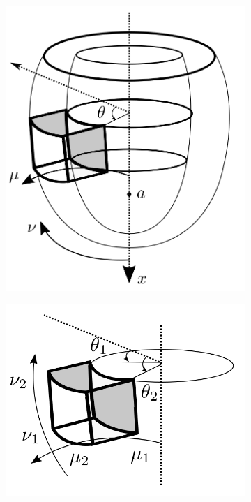 \begin{figure}[htbp]
  \centering
  \begin{subfigure}[t]{0.4\textwidth}
    \includegraphics[width=\textwidth]{chapters/introduction/figures/geometry/prolate.png}
    \caption{\label{fig:prolate_coord}}
  \end{subfigure}
  \begin{subfigure}[t]{0.45\textwidth}
    \includegraphics[width=\textwidth]{chapters/introduction/figures/geometry/prolate_cube.png}
    \caption{\label{fig:prolate_cube}}
  \end{subfigure}
\caption{}
\label{fig:prolate}
\end{figure}

